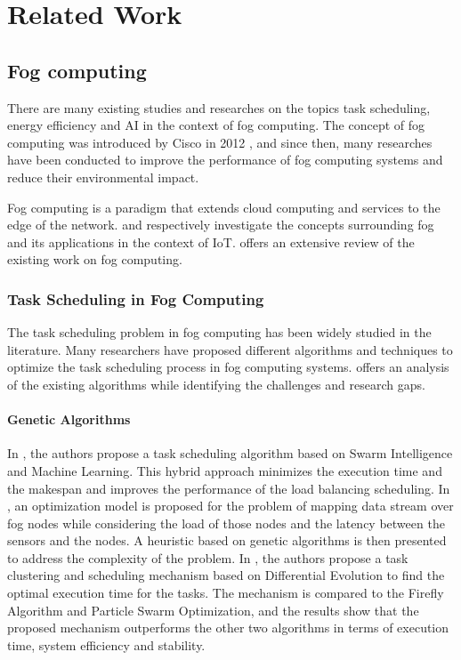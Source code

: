 \chapter{Related Work}
\label{chap:related-work}

\section{Fog computing}
\label{sec:fog-computing}

There are many existing studies and researches on the topics task scheduling, energy efficiency and AI in the context
of fog computing. The concept of fog computing was introduced by Cisco in 2012 \cite{bonomi-et-al-2012}, and since
then, many researches have been conducted to improve the performance of fog computing systems and reduce their
environmental impact.

Fog computing is a paradigm that extends cloud computing and services to the edge of the network.
\cite{rana-abubacker-2023} and \cite{abubacker-et-al-2023} respectively investigate the concepts surrounding fog
and its applications in the context of IoT. \cite{al-musawi-et-al-2023} offers an extensive review of the existing
work on fog computing.

\subsection{Task Scheduling in Fog Computing}
\label{subsec:task-scheduling}

The task scheduling problem in fog computing has been widely studied in the literature. Many researchers have proposed
different algorithms and techniques to optimize the task scheduling process in fog computing systems.
\cite{misirli-casalicchio-2024} offers an analysis of the existing algorithms while identifying the challenges and
research gaps.

\subsubsection*{Genetic Algorithms}
\label{subsubsec:genetic-algorithms}

In \cite{rjoub-bentahar-2017}, the authors propose a task scheduling algorithm based on Swarm Intelligence and Machine
Learning. This hybrid approach minimizes the execution time and the makespan and improves the performance of the load
balancing scheduling. In \cite{canali-lancellotti-2019}, an optimization model is proposed for the problem of mapping
data stream over fog nodes while considering the load of those nodes and the latency between the sensors and the nodes.
A heuristic based on genetic algorithms is then presented to address the complexity of the problem. In
\cite{yousif-et-al-2024}, the authors propose a task clustering and scheduling mechanism based on Differential Evolution
to find the optimal execution time for the tasks. The mechanism is compared to the Firefly Algorithm and Particle Swarm
Optimization, and the results show that the proposed mechanism outperforms the other two algorithms in terms of execution
time, system efficiency and stability.

